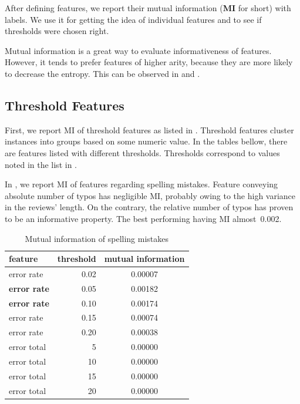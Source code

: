 After defining features, we report their mutual information (\textbf{MI} for short) with labels.
We use it for getting the idea of individual features and
to see if thresholds were chosen right.

Mutual information is a great way to evaluate informativeness of features.
However, it tends to prefer features of higher arity, because
they are more likely to decrease the entropy.
This can be observed in  and .


\subsection{Threshold Features}

First, we report MI of threshold features as listed in .
Threshold features cluster instances into groups based on some numeric value.
In the tables bellow, there are features listed with different thresholds.
Thresholds correspond to values noted in the list in .


In , we report MI of features regarding spelling mistakes.
Feature conveying absolute number of typos has negligible MI, probably owing to the high variance in the reviews' length.
On the contrary, the relative number of typos has proven to be an informative property.
The best performing having MI almost~0.002.

\begin{table}[h!]

\centering
\begin{tabular}{lrS[table-format=3.2]}
\toprule
\textbf{feature} & \textbf{threshold} & \textbf{mutual information} \\
\midrule
error rate & 0.02 & 0.00007 \\
\textbf{error rate} & 0.05 & 0.00182 \\
\textbf{error rate} & 0.10 & 0.00174 \\
error rate & 0.15 & 0.00074 \\
error rate & 0.20 & 0.00038 \\
\midrule
error total & 5 & 0.00000 \\
error total & 10 & 0.00000 \\
error total & 15 & 0.00000 \\
error total & 20 & 0.00000 \\
\bottomrule
\end{tabular}

\caption{Mutual information of spelling mistakes}\label{tab:mi_errors}
\end{table}



